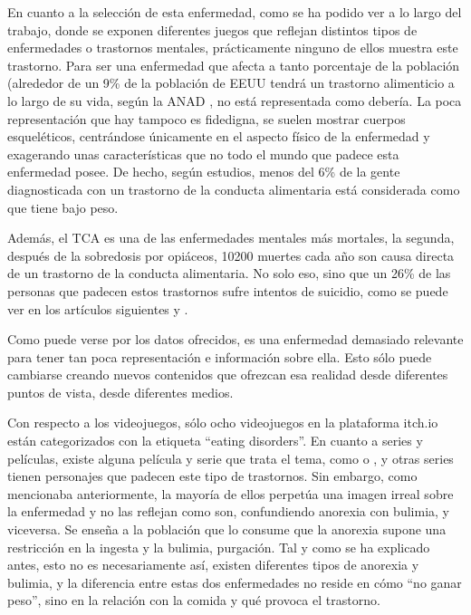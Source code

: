 \documentclass[12pt, a4paper,twoside,titlepage]{book}
\begin{document}
\begin{itemize}
{    En cuanto a la selección de esta enfermedad, como se ha podido ver a lo largo del trabajo, donde se exponen diferentes juegos que reflejan distintos tipos de enfermedades o trastornos mentales, prácticamente ninguno de ellos muestra este trastorno. Para ser una enfermedad que afecta a tanto porcentaje de la población (alrededor de un 9\% de la población de EEUU tendrá un trastorno alimenticio a lo largo de su vida, según la ANAD \cite{articuloTCA5}, no está representada como debería. La poca representación que hay tampoco es fidedigna, se suelen mostrar cuerpos esqueléticos, centrándose únicamente en el aspecto físico de la enfermedad y exagerando unas características que no todo el mundo que padece esta enfermedad posee. De hecho, según estudios, menos del 6\% de la gente diagnosticada con un trastorno de la conducta alimentaria está considerada como que tiene bajo peso. 
    
    Además, el TCA es una de las enfermedades mentales más mortales, la segunda, después de la sobredosis por opiáceos, 10200 muertes cada año son causa directa de un trastorno de la conducta alimentaria. No solo eso, sino que un 26\% de las personas que padecen estos trastornos sufre intentos de suicidio, como se puede ver en los artículos siguientes \cite{articuloTCA6} y \cite{articuloTCA7}. 
    
    Como puede verse por los datos ofrecidos, es una enfermedad demasiado relevante para tener tan poca representación e información sobre ella. Esto sólo puede cambiarse creando nuevos contenidos que ofrezcan esa realidad desde diferentes puntos de vista, desde diferentes medios. 
    
    Con respecto a los videojuegos, sólo ocho videojuegos en la plataforma itch.io están categorizados con la etiqueta “eating disorders”. En cuanto a series y películas, existe alguna película y serie que trata el tema, como  o , y otras series tienen personajes que padecen este tipo de trastornos. Sin embargo, como mencionaba anteriormente, la mayoría de ellos perpetúa una imagen irreal sobre la enfermedad y no las reflejan como son, confundiendo anorexia con bulimia, y viceversa. Se enseña a la población que lo consume que la anorexia supone una restricción en la ingesta y la bulimia, purgación. Tal y como se ha explicado antes, esto no es necesariamente así, existen diferentes tipos de anorexia y bulimia, y la diferencia entre estas dos enfermedades no reside en cómo “no ganar peso”, sino en la relación con la comida y qué provoca el trastorno. 
    
}
\end{itemize}
\end{document}

